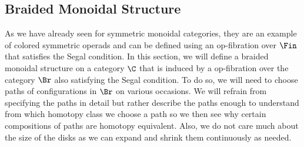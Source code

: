 \subsection{Braided Monoidal Structure}

As we have already seen for symmetric monoidal categories, they are an example of
colored symmetric operads and can be defined using an op-fibration over $\Fin$ that satisfies
the Segal condition. In this section, we will define a braided monoidal structure on a category $\C$
that is induced by a op-fibration over the category $\Br$ also satisfying the Segal condition.
To do so, we will need to choose paths of configurations in $\Br$ on various occasions.
We will refrain from specifying the paths in detail but rather describe the paths enough to 
understand from which homotopy class we choose a path so we then see why certain compositions 
of paths are homotopy equivalent. Also, we do not care much about the size of the
disks as we can expand and shrink them continuously as needed.

